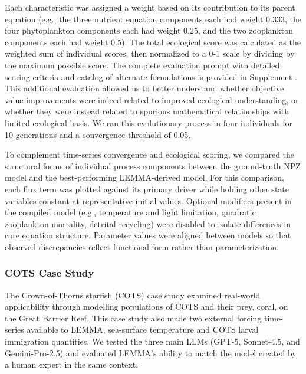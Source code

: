 Each characteristic was assigned a weight based on its contribution to its parent equation (e.g., the three nutrient equation components each had weight 0.333, the four phytoplankton components each had weight 0.25, and the two zooplankton components each had weight 0.5). The total ecological score was calculated as the weighted sum of individual scores, then normalized to a 0-1 scale by dividing by the maximum possible score. The complete evaluation prompt with detailed scoring criteria and catalog of alternate formulations is provided in Supplement%
. This additional evaluation allowed us to better understand whether objective value improvements were indeed related to improved ecological understanding, or whether they were instead related to spurious mathematical relationships with limited ecological basis. We ran this evolutionary process in four individuals for 10 generations and a convergence threshold of 0.05.

To complement time-series convergence and ecological scoring, we compared the structural forms of individual process components between the ground-truth NPZ model and the best-performing LEMMA-derived model. For this comparison, each flux term was plotted against its primary driver while holding other state variables constant at representative initial values. Optional modifiers present in the compiled model (e.g., temperature and light limitation, quadratic zooplankton mortality, detrital recycling) were disabled to isolate differences in core equation structure. Parameter values were aligned between models so that observed discrepancies reflect functional form rather than parameterization. 

\subsubsection{COTS Case Study}

The Crown-of-Thorns starfish (COTS) case study examined real-world applicability through modelling populations of COTS and their prey, coral, on the Great Barrier Reef. This case study also made two external forcing time-series available to LEMMA, sea-surface temperature and COTS larval immigration quantities. We tested the three main LLMs (GPT-5, Sonnet-4.5, and Gemini-Pro-2.5) and evaluated LEMMA's ability to match the model created by a human expert in the same context.

